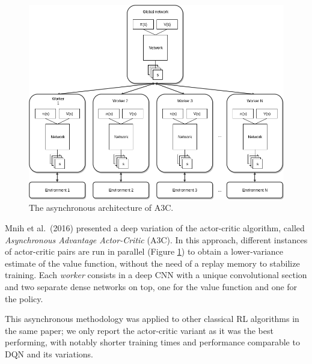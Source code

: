%
%
\begin{figure}[h]
\includegraphics[width=\textwidth]{pictures/a3c}
\centering
\caption[The asynchronous architecture of A3C]{The asynchronous architecture of A3C.}
\label{f:a3c}
\end{figure}
%
Mnih et al.\ (2016) \cite{mnih2016asynchronous} presented a deep variation of 
the actor-critic algorithm, called \textit{Asynchronous Advantage Actor-Critic} 
(A3C). In this approach, different instances of actor-critic pairs are run in 
parallel (Figure \ref{f:a3c}) to obtain a lower-variance estimate of the value 
function, without the need of a replay memory to stabilize training. 
Each \textit{worker} consists in a deep CNN with a unique convolutional section 
and two separate dense networks on top, one for the value function and one for 
the policy. 

This asynchronous methodology was applied to other classical RL algorithms in 
the same paper; we only report the actor-critic variant as it was the best 
performing, with notably shorter training times and performance comparable 
to DQN and its variations.

